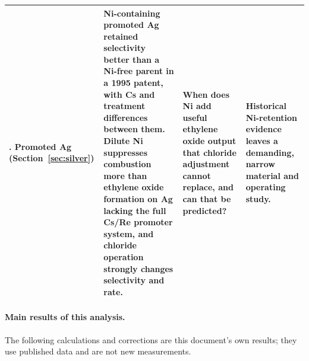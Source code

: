 \begin{table}[htbp]
\begin{tabularx}{\textwidth}{@{}>{\raggedright\arraybackslash}p{}>{\raggedright\arraybackslash}X>{\raggedright\arraybackslash}X>{\raggedright\arraybackslash}p{}@{}}
4. Promoted Ag (Section~\ref{sec:silver}) & Ni-containing promoted Ag retained selectivity better than a Ni-free parent in a 1995 patent, with Cs and treatment differences between them.\citep{kemp1995} Dilute Ni suppresses combustion more than ethylene oxide formation on Ag lacking the full Cs/Re promoter system, and chloride operation strongly changes selectivity and rate.\citep{jalil2025,iyer2021,santos2024} & When does Ni add useful ethylene oxide output that chloride adjustment cannot replace, and can that be predicted? & Historical Ni-retention evidence leaves a demanding, narrow material and operating study.\\
\bottomrule
\end{tabularx}
\end{table}

\paragraph{Main results of this analysis.}
The following calculations and corrections are this document's own results; they use published data and are not new measurements.
